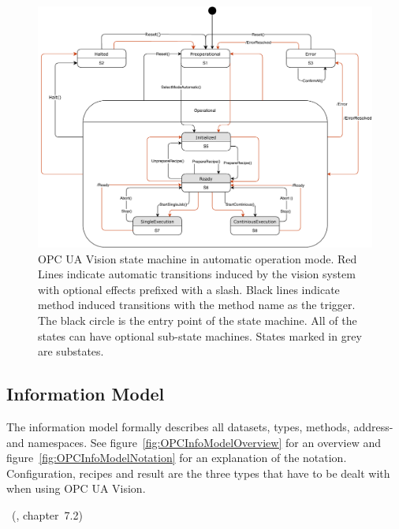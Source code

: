 \begin{figure}[ht]
    \centering
    \includegraphics[width=\textwidth]{img/OPCUAVisionVisionAutomaticModeStateMachineStates.pdf}
    \caption[OPC UA Vision state machine in automatic operation mode]{OPC UA Vision state machine in automatic operation mode. Red Lines indicate automatic transitions induced by the vision system with optional effects prefixed with a slash. Black lines indicate method induced transitions with the method name as the trigger. The black circle is the entry point of the state machine. All of the states can have optional sub-state machines. States marked in grey are substates.~\cite{VDMA2018OPC40100-1:2018-11}}
    \label{fig:OPCStateMachineAutomatic}
\end{figure}

\subsection{Information Model}
The information model formally describes all datasets, types, methods, address- and namespaces. See figure~\ref{fig:OPCInfoModelOverview} for an overview and figure~\ref{fig:OPCInfoModelNotation} for an explanation of the notation. Configuration, recipes and result are the three types that have to be dealt with when using OPC UA Vision.

~(\cite{OPC-Foundation2018OPC1.04}, chapter~7.2)


